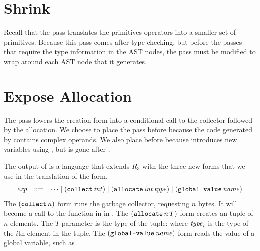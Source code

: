 \documentclass[11pt]{book}
\begin{document}
\section{Shrink}
\label{sec:shrink-R3}

Recall that the  pass translates the primitives operators
into a smaller set of primitives. Because this pass comes after type
checking, but before the passes that require the type information in
the  AST nodes, the  pass must be modified
to wrap  around each AST node that it generates.


\section{Expose Allocation}
\label{sec:expose-allocation}

The pass  lowers the  creation
form into a conditional call to the collector followed by the
allocation.  We choose to place the  pass
before  because the code generated by
 contains complex operands.  We also place
 before  because
 introduces new variables using ,
but  is gone after .

The output of  is a language that extends
$R_3$ with the three new forms that we use in the translation of the
 form.
\[
\begin{array}{lcl}
  \mathit{exp} &::=& \cdots
      \mid (\texttt{collect} \,\mathit{int})
      \mid (\texttt{allocate} \,\mathit{int}\,\mathit{type})
      \mid (\texttt{global-value} \,\mathit{name})
\end{array}
\]
The $(\texttt{collect}\,n)$ form runs the garbage collector, requesting
$n$ bytes. It will become a call to the  function in
 in .  The
$(\texttt{allocate}\,n\,T)$ form creates an tuple of $n$ elements.  The
$T$ parameter is the type of the tuple:  where $\mathit{type}_i$ is the type of the $i$th element in the
tuple. The $(\texttt{global-value}\,\mathit{name})$ form reads the value of
a global variable, such as .
\end{document}

